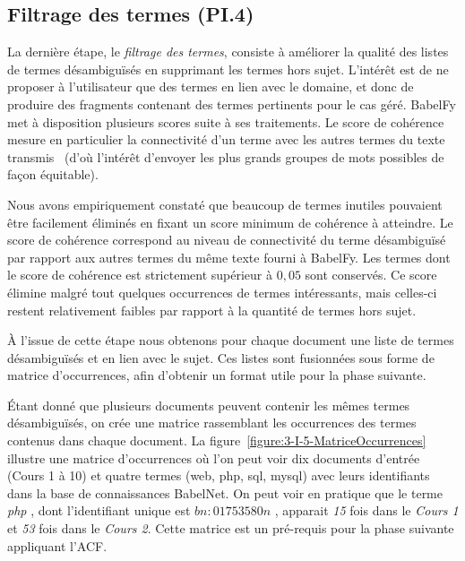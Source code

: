 
\bigskip

\subsection{Filtrage des termes (PI.4)}
\label{subsection:CREA:PI.5-FiltrageTermes}

La dernière étape, le \textit{filtrage des termes}, consiste à améliorer la qualité des listes de termes désambiguïsés en supprimant les termes hors sujet.
L'intérêt est de ne proposer à l'utilisateur que des termes en lien avec le domaine, et donc de produire des fragments contenant des termes pertinents pour le cas géré.
BabelFy met à disposition plusieurs scores suite à ses traitements.
Le score de cohérence mesure en particulier la connectivité d'un terme avec les autres termes du texte transmis~\cite{prohaska2017masterthesis} (d'où l'intérêt d'envoyer les plus grands groupes de mots possibles de façon équitable).

\bigskip

Nous avons empiriquement constaté que beaucoup de termes inutiles pouvaient être facilement éliminés en fixant un score minimum de cohérence à atteindre.
Le score de cohérence correspond au niveau de connectivité du terme désambiguïsé par rapport aux autres termes du même texte fourni à BabelFy.
Les termes dont le score de cohérence est strictement supérieur à $ 0,05 $ sont conservés.
Ce score élimine malgré tout quelques occurrences de termes intéressants, mais celles-ci restent relativement faibles par rapport à la quantité de termes hors sujet.

\bigskip

À l'issue de cette étape nous obtenons pour chaque document une liste de termes désambiguïsés et en lien avec le sujet.
Ces listes sont fusionnées sous forme de matrice d'occurrences, afin d'obtenir un format utile pour la phase suivante.

Étant donné que plusieurs documents peuvent contenir les mêmes termes désambiguïsés, on crée une matrice rassemblant les occurrences des termes contenus dans chaque document.
La figure~\ref{figure:3-I-5-MatriceOccurrences} illustre une matrice d'occurrences où l'on peut voir dix documents d'entrée (Cours 1 à 10) et quatre termes (web, php, sql, mysql) avec leurs identifiants dans la base de connaissances BabelNet.
On peut voir en pratique que le terme \og \textit{php} \fg, dont l'identifiant unique est \og $bn{:}01753580n$ \fg, apparait \textit{15} fois dans le \textit{Cours 1} et \textit{53} fois dans le \textit{Cours 2}.
Cette matrice est un pré-requis pour la phase suivante appliquant l'ACF.

